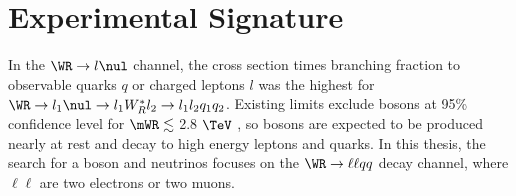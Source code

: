 \section{Experimental Signature}
\label{sec:lrsExpSignature}
In the $\WR \rightarrow l\nul$ channel, the cross section times branching fraction to observable quarks 
$q$ or charged leptons $l$ was the highest for $\WR \rightarrow l_{1}\nul \rightarrow l_{1}W^{*}_{R}l_{2} \rightarrow l_{1}l_{2}q_{1}q_{2}$.  
Existing limits exclude \WR bosons at 95\% confidence level for $\mWR \lesssim$ 2.8 $\TeV$ \cite{cmsWRRunOneResults}, 
so \WR bosons are expected to be produced nearly at rest and decay to high energy leptons and quarks.  In this 
thesis, the search for a \WR boson and \nul neutrinos focuses on the $\WR \rightarrow \ell\ell qq$ decay 
channel, where $\ell\ell$ are two electrons or two muons.

